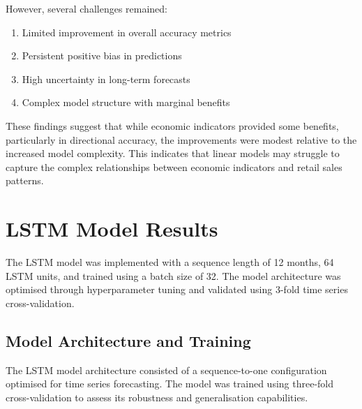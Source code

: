 \documentclass[12pt,a4paper]{report}
\begin{document}
However, several challenges remained:
\begin{enumerate}
    \item Limited improvement in overall accuracy metrics
    \item Persistent positive bias in predictions
    \item High uncertainty in long-term forecasts
    \item Complex model structure with marginal benefits
\end{enumerate}

These findings suggest that while economic indicators provided some benefits, particularly in directional accuracy, the improvements were modest relative to the increased model complexity. This indicates that linear models may struggle to capture the complex relationships between economic indicators and retail sales patterns.

\section{LSTM Model Results}

The LSTM model was implemented with a sequence length of 12 months, 64 LSTM units, and trained using a batch size of 32. The model architecture was optimised through hyperparameter tuning and validated using 3-fold time series cross-validation.

\subsection{Model Architecture and Training}
The LSTM model architecture consisted of a sequence-to-one configuration optimised for time series forecasting. The model was trained using three-fold cross-validation to assess its robustness and generalisation capabilities.
\end{document}

